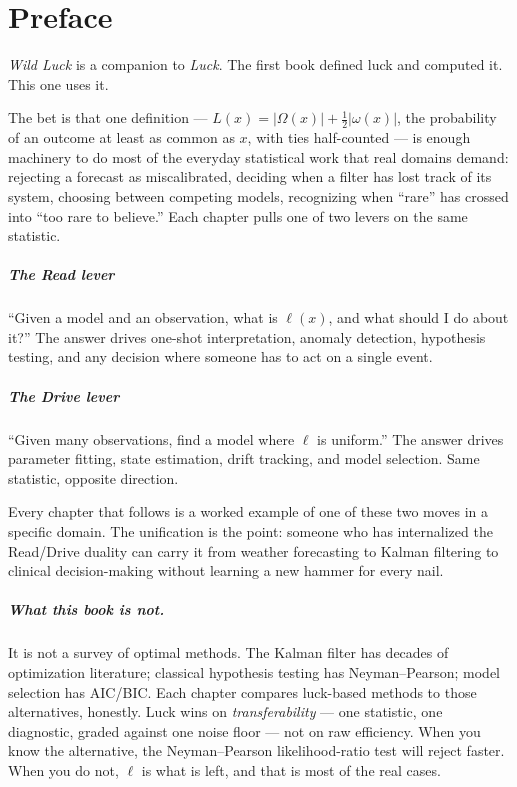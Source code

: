 \chapter*{Preface}

\textit{Wild Luck} is a companion to \textit{Luck}.  The first book defined
luck and computed it.  This one uses it.

The bet is that one definition --- $L(x) = |\Omega(x)| + \tfrac{1}{2}|\omega(x)|$,
the probability of an outcome at least as common as $x$, with ties
half-counted --- is enough machinery to do most of the everyday statistical
work that real domains demand: rejecting a forecast as miscalibrated,
deciding when a filter has lost track of its system, choosing between
competing models, recognizing when ``rare'' has crossed into ``too rare to
believe.''  Each chapter pulls one of two levers on the same statistic.

\paragraph{The Read lever} ``Given a model and an observation, what is
$\ell(x)$, and what should I do about it?''  The answer drives one-shot
interpretation, anomaly detection, hypothesis testing, and any decision
where someone has to act on a single event.

\paragraph{The Drive lever} ``Given many observations, find a model where
$\ell$ is uniform.''  The answer drives parameter fitting, state
estimation, drift tracking, and model selection.  Same statistic, opposite
direction.

Every chapter that follows is a worked example of one of these two moves
in a specific domain.  The unification is the point: someone who has
internalized the Read/Drive duality can carry it from weather forecasting
to Kalman filtering to clinical decision-making without learning a new
hammer for every nail.

\paragraph{What this book is not.}  It is not a survey of optimal methods.
The Kalman filter has decades of optimization literature; classical
hypothesis testing has Neyman--Pearson; model selection has AIC/BIC.  Each
chapter compares luck-based methods to those alternatives, honestly.  Luck
wins on \textit{transferability} --- one statistic, one diagnostic,
graded against one noise floor --- not on raw efficiency.  When you know
the alternative, the Neyman--Pearson likelihood-ratio test will reject
faster.  When you do not, $\ell$ is what is left, and that is most of the
real cases.

